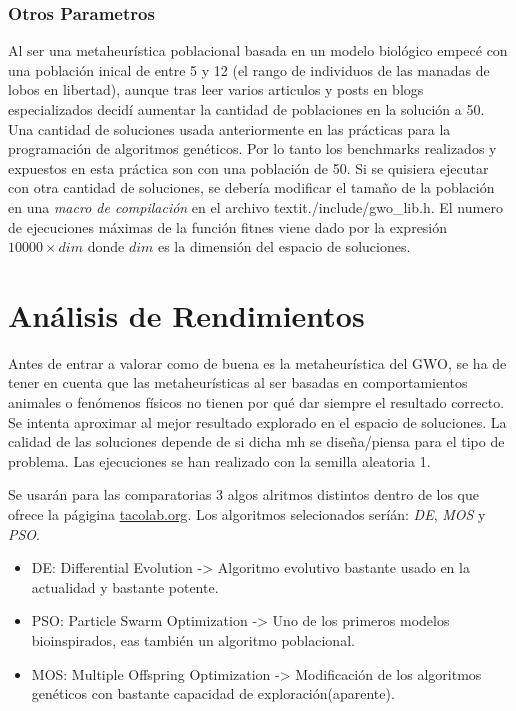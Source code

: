\documentclass[a4paper]{report}
\begin{document}
\subsubsection*{Otros Parametros}
Al ser una metaheurística poblacional basada en un modelo biológico empecé con una población inical de entre 5 y 12 (el rango de individuos de las manadas de lobos en libertad), aunque tras leer varios articulos y posts en blogs especializados decidí aumentar la cantidad de poblaciones en la solución a 50. Una cantidad de soluciones usada anteriormente en las prácticas para la programación de algoritmos genéticos. Por lo tanto los benchmarks realizados y expuestos en esta práctica son con una población de 50. Si se quisiera ejecutar con otra cantidad de soluciones, se debería modificar el tamaño de la población en una \textit{macro de compilación} en el archivo textit{./include/gwo\_lib.h}. El numero de ejecuciones máximas de la función fitnes viene dado por la expresión $10000 \times dim$ donde $dim$ es la dimensión del espacio de soluciones.






\section{Análisis de Rendimientos}

Antes de entrar a valorar como de buena es la metaheurística del GWO, se ha de tener en cuenta que las metaheurísticas al ser basadas en comportamientos animales o fenómenos físicos no tienen por qué dar siempre el resultado correcto.
Se intenta aproximar al mejor resultado explorado en el espacio de soluciones.     La calidad de las soluciones depende de si dicha mh se diseña/piensa para el tipo de problema. Las ejecuciones se han realizado con la semilla aleatoria 1.

Se usarán para las comparatorias 3 algos alritmos distintos dentro de los que ofrece la págigina \url{tacolab.org}. Los algoritmos selecionados seríán: \textit{DE}, \textit{MOS} y \textit{PSO}.
\begin{itemize}
    \item DE: Differential Evolution -> Algoritmo evolutivo bastante usado en la actualidad y bastante potente.
    \item PSO: Particle Swarm Optimization -> Uno de los primeros modelos bioinspirados, eas también un algoritmo poblacional.
    \item MOS: Multiple Offspring Optimization -> Modificación de los algoritmos genéticos con bastante capacidad de exploración(aparente).
\end{itemize}
\end{document}
